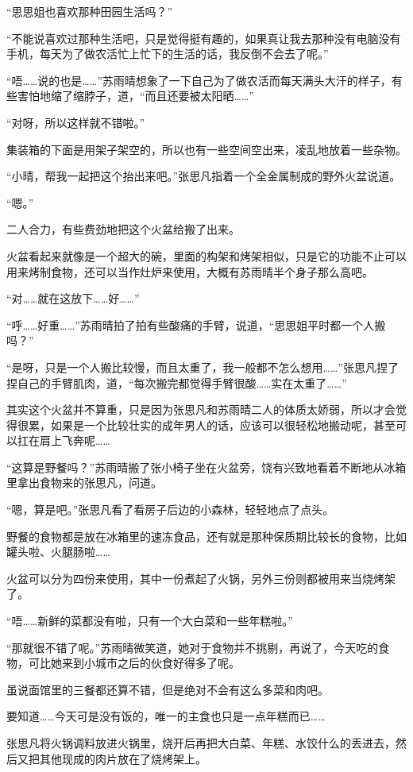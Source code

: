 “思思姐也喜欢那种田园生活吗？”

“不能说喜欢过那种生活吧，只是觉得挺有趣的，如果真让我去那种没有电脑没有手机，每天为了做农活忙上忙下的生活的话，我反倒不会去了呢。”

“唔……说的也是……”苏雨晴想象了一下自己为了做农活而每天满头大汗的样子，有些害怕地缩了缩脖子，道，“而且还要被太阳晒……”

“对呀，所以这样就不错啦。”

集装箱的下面是用架子架空的，所以也有一些空间空出来，凌乱地放着一些杂物。

“小晴，帮我一起把这个抬出来吧。”张思凡指着一个全金属制成的野外火盆说道。

“嗯。”

二人合力，有些费劲地把这个火盆给搬了出来。

火盆看起来就像是一个超大的碗，里面的构架和烤架相似，只是它的功能不止可以用来烤制食物，还可以当作灶炉来使用，大概有苏雨晴半个身子那么高吧。

“对……就在这放下……好……”

“呼……好重……”苏雨晴拍了拍有些酸痛的手臂，说道，“思思姐平时都一个人搬吗？”

“是呀，只是一个人搬比较慢，而且太重了，我一般都不怎么想用……”张思凡捏了捏自己的手臂肌肉，道，“每次搬完都觉得手臂很酸……实在太重了……”

其实这个火盆并不算重，只是因为张思凡和苏雨晴二人的体质太娇弱，所以才会觉得很累，如果是一个比较壮实的成年男人的话，应该可以很轻松地搬动呢，甚至可以扛在肩上飞奔呢……

“这算是野餐吗？”苏雨晴搬了张小椅子坐在火盆旁，饶有兴致地看着不断地从冰箱里拿出食物来的张思凡，问道。

“嗯，算是吧。”张思凡看了看房子后边的小森林，轻轻地点了点头。

野餐的食物都是放在冰箱里的速冻食品，还有就是那种保质期比较长的食物，比如罐头啦、火腿肠啦……

火盆可以分为四份来使用，其中一份煮起了火锅，另外三份则都被用来当烧烤架了。

“唔……新鲜的菜都没有啦，只有一个大白菜和一些年糕啦。”

“那就很不错了呢。”苏雨晴微笑道，她对于食物并不挑剔，再说了，今天吃的食物，可比她来到小城市之后的伙食好得多了呢。

虽说面馆里的三餐都还算不错，但是绝对不会有这么多菜和肉吧。

要知道……今天可是没有饭的，唯一的主食也只是一点年糕而已……

张思凡将火锅调料放进火锅里，烧开后再把大白菜、年糕、水饺什么的丢进去，然后又把其他现成的肉片放在了烧烤架上。

